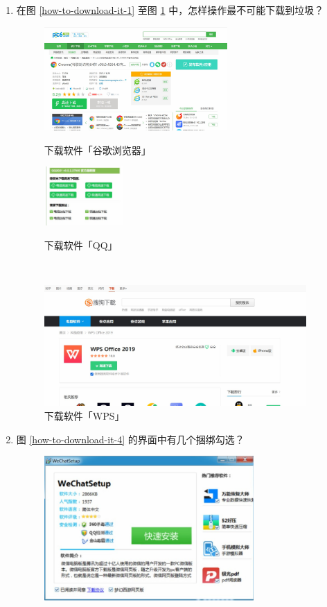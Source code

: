 \begin{enumerate}
  \item 在图 \ref{how-to-download-it-1} 至图 \ref{how-to-download-it-3} 中，怎样操作最不可能下载到垃圾？
  \begin{figure}[htb!]
    \centering
    \begin{minipage}{8cm}
      \centering
      \includegraphics[width=7cm]{assets/How_to_1.jpg}
      \caption{下载软件「谷歌浏览器」}
      \label{how-to-download-it-1}
    \end{minipage}
    \qquad
    \begin{minipage}{4cm}
      \centering
      \includegraphics[width=3cm]{assets/How_to_2.jpg}
      \caption{下载软件「QQ」}
      \label{how-to-download-it-2}
    \end{minipage}    
    \\
    \vspace{1ex}
    \begin{minipage}{12cm}
      \centering
      \includegraphics[width=10cm]{assets/How_to_3.jpg}
      \caption{下载软件「WPS」}
      \label{how-to-download-it-3}
    \end{minipage}
  \end{figure}
  \item 图 \ref{how-to-download-it-4} 的界面中有几个捆绑勾选？
  \begin{figure}[htbp]
    \centering
    \includegraphics[width=8cm]{assets/How_to_4.jpg}

\end{figure}
\end{enumerate}
